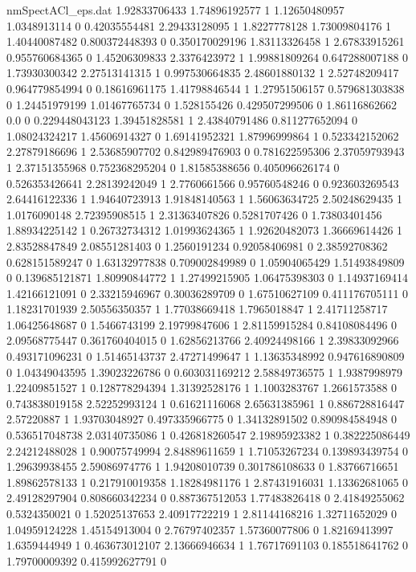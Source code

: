 \begin{filecontents}{nmSpectACl_eps.dat}
1.92833706433 1.74896192577 1
1.12650480957 1.0348913114 0
0.42035554481 2.29433128095 1
1.8227778128 1.73009804176 1
1.40440087482 0.800372448393 0
0.350170029196 1.83113326458 1
2.67833915261 0.955760684365 0
1.45206309833 2.3376423972 1
1.99881809264 0.647288007188 0
1.73930300342 2.27513141315 1
0.997530664835 2.48601880132 1
2.52748209417 0.964779854994 0
0.18616961175 1.41798846544 1
1.27951506157 0.579681303838 0
1.24451979199 1.01467765734 0
1.528155426 0.429507299506 0
1.86116862662 0.0 0
0.229448043123 1.39451828581 1
2.43840791486 0.811277652094 0
1.08024324217 1.45606914327 0
1.69141952321 1.87996999864 1
0.523342152062 2.27879186696 1
2.53685907702 0.842989476903 0
0.781622595306 2.37059793943 1
2.37151355968 0.752368295204 0
1.81585388656 0.405096626174 0
0.526353426641 2.28139242049 1
2.7760661566 0.95760548246 0
0.923603269543 2.64416122336 1
1.94640723913 1.91848140563 1
1.56063634725 2.50248629435 1
1.0176090148 2.72395908515 1
2.31363407826 0.5281707426 0
1.73803401456 1.88934225142 1
0.26732734312 1.01993624365 1
1.92620482073 1.36669614426 1
2.83528847849 2.08551281403 0
1.2560191234 0.92058406981 0
2.38592708362 0.628151589247 0
1.63132977838 0.709002849989 0
1.05904065429 1.51493849809 0
0.139685121871 1.80990844772 1
1.27499215905 1.06475398303 0
1.14937169414 1.42166121091 0
2.33215946967 0.30036289709 0
1.67510627109 0.411176705111 0
1.18231701939 2.50556350357 1
1.77038669418 1.7965018847 1
2.41711258717 1.06425648687 0
1.5466743199 2.19799847606 1
2.81159915284 0.84108084496 0
2.09568775447 0.361760404015 0
1.62856213766 2.40924498166 1
2.39833092966 0.493171096231 0
1.51465143737 2.47271499647 1
1.13635348992 0.947616890809 0
1.04349043595 1.39023226786 0
0.603031169212 2.58849736575 1
1.9387998979 1.22409851527 1
0.128778294394 1.31392528176 1
1.1003283767 1.2661573588 0
0.743838019158 2.52252993124 1
0.61621116068 2.65631385961 1
0.886728816447 2.57220887 1
1.93703048927 0.497335966775 0
1.34132891502 0.890984584948 0
0.536517048738 2.03140735086 1
0.426818260547 2.19895923382 1
0.382225086449 2.24212488028 1
0.90075749994 2.84889611659 1
1.71053267234 0.139893439754 0
1.29639938455 2.59086974776 1
1.94208010739 0.301786108633 0
1.83766716651 1.89862578133 1
0.217910019358 1.18284981176 1
2.87431916031 1.13362681065 0
2.49128297904 0.808660342234 0
0.887367512053 1.77483826418 0
2.41849255062 0.5324350021 0
1.52025137653 2.40917722219 1
2.81144168216 1.32711652029 0
1.04959124228 1.45154913004 0
2.76797402357 1.57360077806 0
1.82169413997 1.6359444949 1
0.463673012107 2.13666946634 1
1.76717691103 0.185518641762 0
1.79700009392 0.415992627791 0

\end{filecontents}
